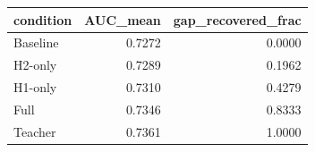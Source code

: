 \begin{tabular}{lrr}
\toprule
condition & AUC_mean & gap_recovered_frac \\
\midrule
Baseline & 0.7272 & 0.0000 \\
H2-only & 0.7289 & 0.1962 \\
H1-only & 0.7310 & 0.4279 \\
Full & 0.7346 & 0.8333 \\
Teacher & 0.7361 & 1.0000 \\
\bottomrule
\end{tabular}
